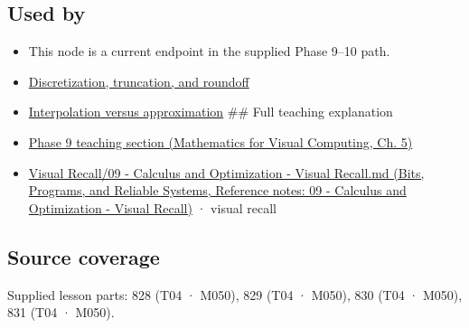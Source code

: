 \subsection{Used by}\label{appendix-32f39e9a3738-used-by}

\hypertarget{appendix-32f39e9a3738-used-by}{}

\begin{itemize}
\item
  This node is a current endpoint in the supplied Phase 9--10 path.
\item
  \hyperref[appendix-6b0648b2b8e8]{Discretization, truncation, and roundoff}
\item
  \hyperref[appendix-0c2a5f69851e]{Interpolation versus approximation} \#\# Full teaching explanation
\item
  \href{../02-Mathematics-for-Visual-Computing/main.pdf\#nameddest=02-foundations-ii-ch021-jacobians-curvature-and-local-approximation}{Phase 9 teaching section (Mathematics for Visual Computing, Ch. 5)}
\item
  \href{../01-Bits-Programs-and-Reliable-Systems/main.pdf\#nameddest=appendix-adf48f5dc5c1}{Visual Recall/09 - Calculus and Optimization - Visual Recall.md (Bits, Programs, and Reliable Systems, Reference notes: 09 - Calculus and Optimization - Visual Recall)} · visual recall
\end{itemize}

\subsection{Source coverage}\label{appendix-32f39e9a3738-source-coverage}

\hypertarget{appendix-32f39e9a3738-source-coverage}{}

Supplied lesson parts: 828 (T04 · M050), 829 (T04 · M050), 830 (T04 · M050), 831 (T04 · M050).
